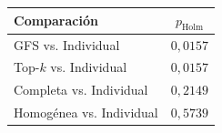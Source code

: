 \begin{resulttable}
\centering\fontsize{9}{11}\selectfont\setlength{\tabcolsep}{5pt}
\caption{Comparaciones frente a Individual con los clasificadores separados. Valores $p$ ajustados mediante Holm.}
\label{tab:vs-individual-disaggregated}
\begin{tabular}{@{}lc@{}}
\toprule
Comparación & $p_{\mathrm{Holm}}$ \\
\midrule
GFS vs. Individual & $0{,}0157$ \\
Top-$k$ vs. Individual & $0{,}0157$ \\
Completa vs. Individual & $0{,}2149$ \\
Homogénea vs. Individual & $0{,}5739$ \\
\bottomrule
\end{tabular}
\par{}
\end{resulttable}
\FloatBarrier
